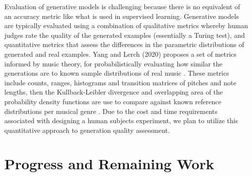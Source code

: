 \documentclass[sigconf,authorversion]{acmart}
\begin{document}
Evaluation of generative models is challenging because there is no equivalent of
an accuracy metric like what is used in supervised learning. Generative models
are typically evaluated using a combination of qualitative metrics whereby human
judges rate the quality of the generated examples (essentially a Turing test),
and quantitative metrics that assess the differences in the parametric
distributions of generated and real examples. Yang and Lerch (2020) proposes a
set of metrics informed by music theory, for probabilistically evaluating how
similar the generations are to known sample distributions of real music
\cite{yang_evaluation_2020}. These metrics include counts, ranges, histograms
and transition matrices of pitches and note lengths, then the Kullback-Leibler
divergence and overlapping area of the probability density functions are use to
compare against known reference distributions per musical genre
\cite{yang_evaluation_2020}. Due to the cost and time requirements associated
with designing a human subjects experiment, we plan to utilize this quantitative
approach to generation quality assessment.

\section{Progress and Remaining Work}



\end{document}
